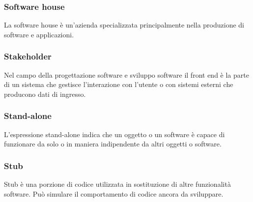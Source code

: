 \subsubsection*{Software house}
La software house è un'azienda specializzata principalmente nella produzione di software e applicazioni.
\subsubsection*{Stakeholder}
Nel campo della progettazione software e sviluppo software il front end è la parte di un sistema che gestisce l’interazione con l’utente o con sistemi esterni che producono dati di ingresso.
\subsubsection*{Stand-alone}
L'espressione stand-alone indica che un oggetto o un software è capace di funzionare da solo o in maniera indipendente da altri oggetti o software.
\subsubsection*{Stub}
Stub è una porzione di codice utilizzata in sostituzione di altre funzionalità software. Può simulare il comportamento di codice ancora da sviluppare.

